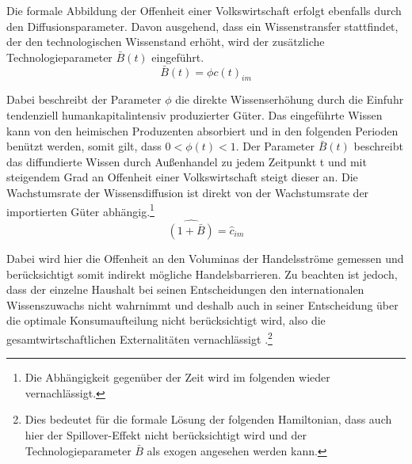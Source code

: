 Die formale Abbildung der Offenheit einer Volkswirtschaft erfolgt ebenfalls durch den Diffusionsparameter. Davon ausgehend, dass ein Wissenstransfer stattfindet, der den technologischen Wissenstand erhöht, wird der zusätzliche Technologieparameter $\bar{B}(t)$ eingeführt. 
%
\begin{equation}
\bar{B}(t)=\phi c(t)_{im}\label{Offenheit}
\end{equation}
%

Dabei beschreibt der Parameter $\phi$ die direkte Wissenserhöhung durch die Einfuhr tendenziell humankapitalintensiv produzierter Güter. Das eingeführte Wissen kann von den heimischen Produzenten absorbiert und in den folgenden Perioden benützt werden, somit gilt, dass $0<\phi(t)<1$. Der Parameter $\bar{B}(t)$ beschreibt das diffundierte Wissen durch Außenhandel zu jedem Zeitpunkt t und mit steigendem Grad an Offenheit einer Volkswirtschaft steigt dieser an. Die Wachstumsrate der Wissensdiffusion ist direkt von der Wachstumsrate der importierten Güter abhängig.\footnote{Die Abhängigkeit gegenüber der Zeit wird im folgenden wieder vernachlässigt.}
%
\begin{equation}
\widehat{(1+\bar{B})}=\hat{c}_{im}
\end{equation}
%
 
Dabei wird hier die Offenheit an den Voluminas der Handelsströme gemessen und berücksichtigt somit indirekt mögliche Handelsbarrieren. Zu beachten ist jedoch, dass der einzelne Haushalt bei seinen Entscheidungen den internationalen Wissenszuwachs nicht wahrnimmt und deshalb auch in seiner Entscheidung über die optimale Konsumaufteilung nicht berücksichtigt wird, also die gesamtwirtschaftlichen Externalitäten vernachlässigt \cite{Romer.1986}.\footnote{Dies bedeutet für die formale Lösung der folgenden Hamiltonian, dass auch hier der Spillover-Effekt nicht berücksichtigt wird und der Technologieparameter $\bar{B}$ als exogen angesehen werden kann.}

